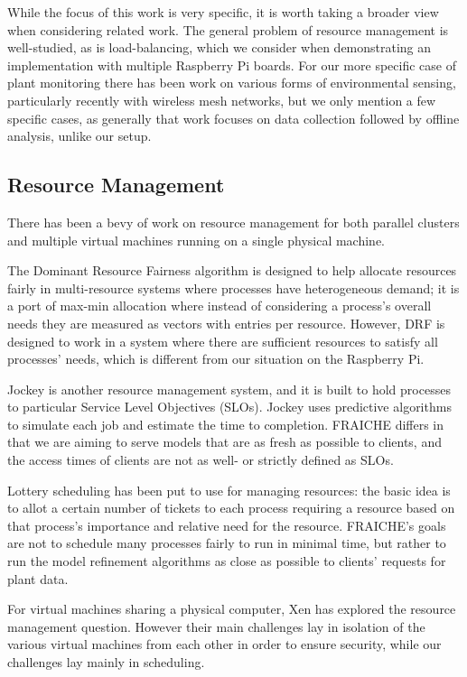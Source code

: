 \documentclass[a4paper]{acm_proc_article-sp}
\begin{document}
While the focus of this work is very specific, it is worth taking a broader view when considering related work.  The general problem of resource management is well-studied, as is load-balancing, which we consider when demonstrating an implementation with multiple Raspberry Pi boards.  For our more specific case of plant monitoring there has been work on various forms of environmental sensing, particularly recently with wireless mesh networks, but we only mention a few specific cases, as generally that work focuses on data collection followed by offline analysis, unlike our setup.

\subsection{Resource Management}
There has been a bevy of work on resource management for both parallel clusters and multiple virtual machines running on a single physical machine.

The Dominant Resource Fairness algorithm \cite{} is designed to help allocate resources fairly in multi-resource systems where processes have heterogeneous demand; it is a port of max-min allocation \cite{} where instead of considering a process's overall needs they are measured as vectors with entries per resource.  However, DRF is designed to work in a system where there are sufficient resources to satisfy all processes' needs, which is different from our situation on the Raspberry Pi.

Jockey \cite{} is another resource management system, and it is built to hold processes to particular Service Level Objectives (SLOs).  Jockey uses predictive algorithms to simulate each job and estimate the time to completion.  FRAICHE differs in that we are aiming to serve models that are as fresh as possible to clients, and the access times of clients are not as well- or strictly defined as SLOs.

Lottery scheduling has been put to use for managing resources: the basic idea is to allot a certain number of tickets to each process requiring a resource based on that process's importance and relative need for the resource.  FRAICHE's goals are not to schedule many processes fairly to run in minimal time, but rather to run the model refinement algorithms as close as possible to clients' requests for plant data.

For virtual machines sharing a physical computer, Xen has explored the resource management question.  However their main challenges lay in isolation of the various virtual machines from each other in order to ensure security, while our challenges lay mainly in scheduling.
\end{document}
